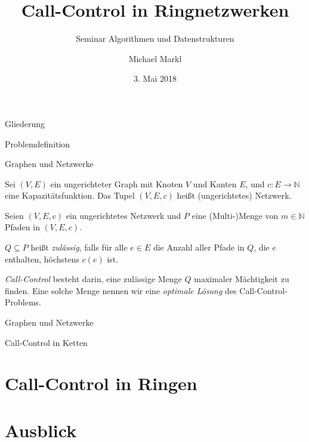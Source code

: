 \documentclass{beamer}
\title{Call-Control in Ringnetzwerken}
\subtitle{Seminar \glqq Algorithmen und Datenstrukturen\grqq}
\author{Michael Markl}
\date{3. Mai 2018}
\institute{Universität Augsburg}
\newcommand{\set}{\mathbb}
\newcommand{\CallControl}{Call-Control}
\begin{document}
	\frame{\titlepage}
	
	\begin{frame}
		\begin{figure}[htbp]
			\centering
			\small
			\def\svgwidth{180bp}
			
			\label{fig:example-ring}
		\end{figure}
	\end{frame}
	
	\begin{frame}{Gliederung}
		\tableofcontents
	\end{frame}
	
	\begin{section}{Problemdefinition}
	\begin{frame}{Graphen und Netzwerke}
		\begin{definition}[Netzwerk]
			Sei $(V,E)$ ein ungerichteter Graph mit Knoten $V$ und Kanten $E$, und $c: E \to \set N$ eine Kapazitätsfunktion.
			Das Tupel $(V,E,c)$ heißt (ungerichtetes) Netzwerk.
		\end{definition}
		\begin{definition}[\CallControl]
   			Seien $(V,E,c)$ ein ungerichtetes Netzwerk und $P$ eine (Multi-)Menge von $m \in \set N$ Pfaden in $(V,E,c)$.
			
			$Q \subseteq P$ heißt {\em zulässig}, falls für alle $e \in E$ die Anzahl aller Pfade in $Q$,
			die $e$ enthalten, höchstens $c(e)$ ist.
			
			{\em \CallControl} besteht darin, eine zulässige Menge $Q$ maximaler Mächtigkeit zu finden.
			Eine solche Menge nennen wir eine {\em optimale Lösung} des \CallControl-Problems.
		\end{definition}
	\end{frame}

	\begin{frame}{Graphen und Netzwerke}
		
	\end{frame}
	
	\end{section}
	
	


\begin{section}{Call-Control in Ketten}
	
\end{section}


	\section{Call-Control in Ringen}
	\begin{frame}
	
	\end{frame}
	
	\section{Ausblick}
 
\end{document}
